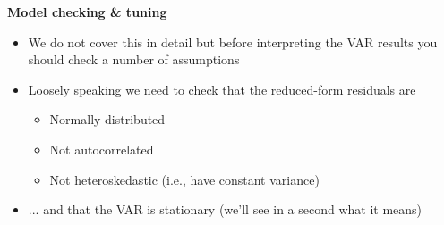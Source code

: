 \documentclass[10pt,handout]{beamer}
\begin{document}
\begin{frame}
{\textbf{Model checking \& tuning}}

\begin{itemize}
\item We do not cover this in detail but before interpreting the VAR results
you should check a number of assumptions\medskip \pause

\item Loosely speaking we need to check that the {{\color{red} reduced-form
residuals}} are

\begin{itemize}
\item Normally distributed

\item Not autocorrelated

\item Not heteroskedastic (i.e., have constant variance)\medskip \pause
\end{itemize}

\item ... and that the VAR is stationary (we'll see in a second what it
means)
\end{itemize}
\end{frame}

\vspace{.1cm}
\end{document}
